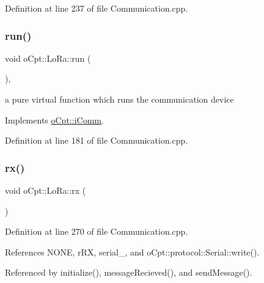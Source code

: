 Definition at line 237 of file Communication.\+cpp.

\hypertarget{classo_cpt_1_1_lo_ra_aacbca715826b810736e9bf5c3a9ce338}{}\label{classo_cpt_1_1_lo_ra_aacbca715826b810736e9bf5c3a9ce338} 
\subsubsection{\texorpdfstring{run()}{run()}}
{\footnotesize\ttfamily void o\+Cpt\+::\+Lo\+Ra\+::run (\begin{DoxyParamCaption}{ }\end{DoxyParamCaption})\hspace{0.3cm}{\ttfamily [override]}, {\ttfamily [virtual]}}

a pure virtual function which runs the communication device 

Implements \hyperlink{classo_cpt_1_1i_comm_a0d15a29fb59dd6a74b56a126d03b9170}{o\+Cpt\+::i\+Comm}.



Definition at line 181 of file Communication.\+cpp.

\hypertarget{classo_cpt_1_1_lo_ra_aa9051cc9d611edc2b5e1f36124d4e972}{}\label{classo_cpt_1_1_lo_ra_aa9051cc9d611edc2b5e1f36124d4e972} 
\subsubsection{\texorpdfstring{rx()}{rx()}}
{\footnotesize\ttfamily void o\+Cpt\+::\+Lo\+Ra\+::rx (\begin{DoxyParamCaption}{ }\end{DoxyParamCaption})\hspace{0.3cm}{\ttfamily [protected]}}



Definition at line 270 of file Communication.\+cpp.



References N\+O\+NE, r\+RX, serial\+\_\+, and o\+Cpt\+::protocol\+::\+Serial\+::write().



Referenced by initialize(), message\+Recieved(), and send\+Message().

